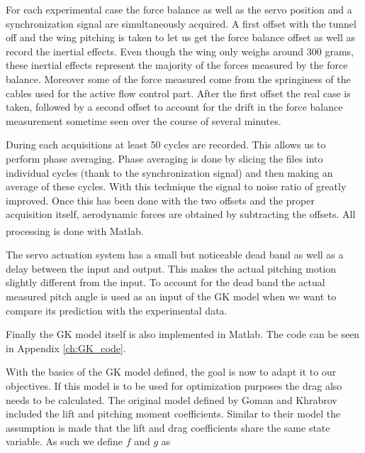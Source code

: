 \par For each experimental case the force balance as well as the servo position and a synchronization signal are simultaneously acquired.
A first offset with the tunnel off and the wing pitching is taken to let us get the force balance offset as well as record the inertial effects.
Even though the wing only weighs around 300 grams, these inertial effects represent the majority of the forces measured by the force balance.
Moreover some of the force measured come from the springiness of the cables used for the active flow control part.
After the first offset the real case is taken, followed by a second offset to account for the drift in the force balance measurement sometime seen over the course of several minutes.

\par During each acquisitions at least 50 cycles are recorded.
This allows us to perform phase averaging.
Phase averaging is done by slicing the files into individual cycles (thank to the synchronization signal) and then making an average of these cycles.
With this technique the signal to noise ratio of greatly improved.
Once this has been done with the two offsets and the proper acquisition itself, aerodynamic forces are obtained by subtracting the offsets.
All processing is done with Matlab\textsuperscript{\textregistered}. 

\par The servo actuation system has a small but noticeable dead band as well as a delay between the input and output.
This makes the actual pitching motion slightly different from the input.
To account for the dead band the actual measured pitch angle is used as an input of the GK model when we want to compare its prediction with the experimental data.

\par Finally the GK model itself is also implemented in Matlab.
The code can be seen in Appendix \ref{ch:GK_code}.



\FloatBarrier



With the basics of the GK model defined, the goal is now to adapt it to our objectives.
If this model is to be used for optimization purposes the drag also needs to be calculated.
The original model defined by Goman and Khrabrov included the lift and pitching moment coefficients.
Similar to their model the assumption is made that the lift and drag coefficients share the same state variable.
As such we define $f$ and $g$ as

